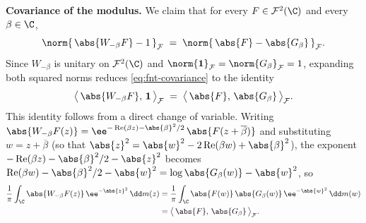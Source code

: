 \medskip
\noindent\textbf{Covariance of the modulus.}\;
We claim that for every $F \in \mathcal{F}^2(\C)$ and every
$\beta \in \C$,
\begin{equation}\label{eq:fnt-covariance}
\norm{\, \abs{W_{-\beta} F} - 1 \,}_{\mathcal{F}}
\;=\;
\norm{\, \abs{F} - \abs{G_\beta} \,}_{\mathcal{F}}.
\end{equation}
Since $W_{-\beta}$ is unitary on $\mathcal{F}^2(\C)$ and
$\norm{\mathbf{1}}_{\mathcal{F}} = \norm{G_\beta}_{\mathcal{F}} = 1$,
expanding both squared norms reduces \eqref{eq:fnt-covariance} to the identity
\[
\bigl\langle\, \abs{W_{-\beta} F},\, \mathbf{1} \,\bigr\rangle_{\mathcal{F}}
\;=\;
\bigl\langle\, \abs{F},\, \abs{G_\beta} \,\bigr\rangle_{\mathcal{F}}.
\]
This identity follows from a direct change of variable.  Writing
$\abs{W_{-\beta} F(z)}
= \ee^{-\operatorname{Re}(\beta z) - \abs{\beta}^2/2}\,
\abs{F(z + \overline{\beta})}$ and substituting $w = z + \overline{\beta}$
(so that $\abs{z}^2 = \abs{w}^2 - 2\operatorname{Re}(\beta w) + \abs{\beta}^2$),
the exponent
$-\operatorname{Re}(\beta z) - \abs{\beta}^2/2 - \abs{z}^2$
becomes $\operatorname{Re}(\beta w) - \abs{\beta}^2/2 - \abs{w}^2
= \log \abs{G_\beta(w)} - \abs{w}^2$, so
\[
\begin{aligned}
\frac{1}{\pi}\int_{\C} \abs{W_{-\beta} F(z)}\,
\ee^{-\abs{z}^2}\,\dd m(z)
&=
\frac{1}{\pi}\int_{\C} \abs{F(w)}\,
\abs{G_\beta(w)}\, \ee^{-\abs{w}^2}\,\dd m(w)
\\
&=
\bigl\langle\, \abs{F},\, \abs{G_\beta} \,\bigr\rangle_{\mathcal{F}}.
\end{aligned}
\]

